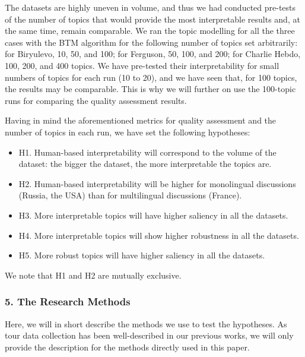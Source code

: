 The datasets are highly uneven in volume, and thus we had conducted pre-tests of the number of topics that would provide the most interpretable results and, at the same time, remain comparable. We ran the topic modelling for all the three cases with the BTM algorithm for the following number of topics set arbitrarily: for Biryulevo, 10, 50, and 100; for Ferguson, 50, 100, and 200; for Charlie Hebdo, 100, 200, and 400 topics. We have pre-tested their interpretability for small numbers of topics for each run (10 to 20), and we have seen that, for 100 topics, the results may be comparable. This is why we will further on use the 100-topic runs for comparing the quality assessment results.

Having in mind the aforementioned metrics for quality assessment and the number of topics in each run, we have set the following hypotheses:
\begin{itemize}
	\item H1. Human-based interpretability will correspond to the volume of the dataset: the bigger the dataset, the more interpretable the topics are.
	\item H2. Human-based interpretability will be higher for monolingual discussions (Russia, the USA) than for multilingual discussions (France).
	\item H3. More interpretable topics will have higher saliency in all the datasets. 
	\item H4. More interpretable topics will show higher robustness in all the datasets. 
	\item H5. More robust topics will have higher saliency in all the datasets.
\end{itemize}

We note that H1 and H2 are mutually exclusive.

\subsubsection{5. The Research Methods}

Here, we will in short describe the methods we use to test the hypotheses. As tour data collection has been well-described in our previous works, we will only provide the description for the methods directly used in this paper.

